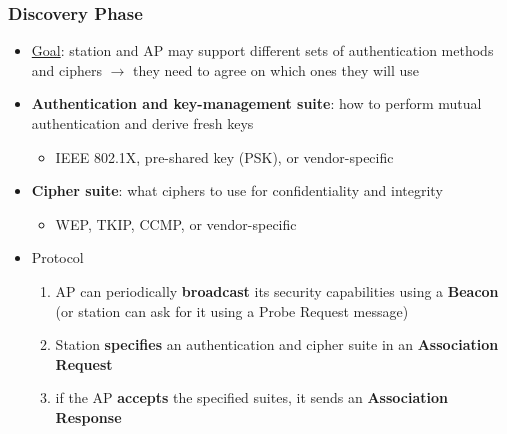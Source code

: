\documentclass[final]{article}
\begin{document}
\subsubsection*{Discovery Phase}
\begin{itemize}[nosep]
    \item \underline{Goal}: station and AP may support different sets of authentication methods and ciphers $\rightarrow$ they need to agree on which ones they will use
    \item \textbf{Authentication and key-management suite}: how to perform mutual authentication and derive fresh keys
          \begin{itemize}[nosep]
              \item IEEE 802.1X, pre-shared key (PSK), or vendor-specific
          \end{itemize}
    \item \textbf{Cipher suite}: what ciphers to use for confidentiality and integrity
          \begin{itemize}
              \item WEP, TKIP, CCMP, or vendor-specific
          \end{itemize}
    \item Protocol
          \begin{enumerate}[nosep]
              \item AP can periodically \textbf{broadcast} its security capabilities using a \textbf{Beacon} (or station can ask for it using a Probe Request message)
              \item Station \textbf{specifies} an authentication and cipher suite in an \textbf{Association Request}
              \item if the AP \textbf{accepts} the specified suites, it sends an \textbf{Association Response}
          \end{enumerate}
\end{itemize}
\end{document}
